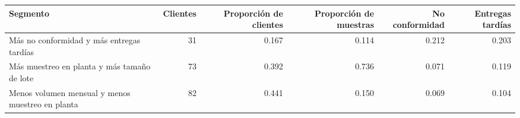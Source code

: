 \begin{tabular}{lrrrrr}
\toprule
Segmento & Clientes & Proporción de clientes & Proporción de muestras & No conformidad & Entregas tardías \\
\midrule
Más no conformidad y más entregas tardías & 31 & 0.167 & 0.114 & 0.212 & 0.203 \\
Más muestreo en planta y más tamaño de lote & 73 & 0.392 & 0.736 & 0.071 & 0.119 \\
Menos volumen mensual y menos muestreo en planta & 82 & 0.441 & 0.150 & 0.069 & 0.104 \\
\bottomrule
\end{tabular}

